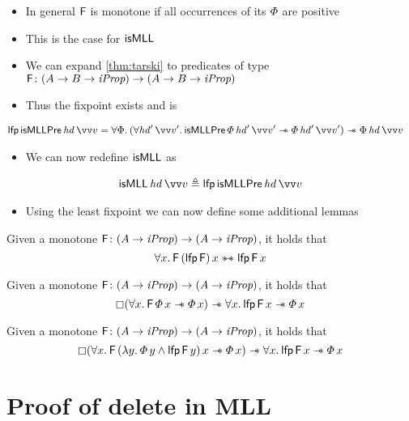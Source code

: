 \documentclass[thesis.tex]{subfiles}
\begin{document}
\begin{itemize}
  \item In general $\textsf{\upshape F}$ is monotone if all occurrences of its $\varPhi$ are positive
  \item This is the case for $\textsf{\upshape isMLL}$
  \item We can expand \cref*{thm:tarski} to predicates of type $\textsf{\upshape F}\colon (A \to B \to \textit{iProp}) \to (A \to B \to \textit{iProp})$
  \item Thus the fixpoint exists and is
\end{itemize}
\begin{align*}
  \lfp\, \textlog{isMLLPre}\, \langv{hd}\, \vect{v} & = \All \Phi. (\All \langv{hd}'\, \vect{v}'. \textlog{isMLLPre}\, \pred\, \langv{hd}'\, \vect{v}' \wand \pred\, \langv{hd}'\, \vect{v}') \wand \Phi \, \langv{hd}\, \vect{v}
\end{align*}
\begin{itemize}
  \item We can now redefine $\textsf{\upshape isMLL}$ as
\end{itemize}
\begin{align*}
  \textlog{isMLL}\, \langv{hd}\, \vect{v} \eqdef \lfp\, \textlog{isMLLPre}\, \langv{hd}\, \vect{v}
\end{align*}
\begin{itemize}
  \item Using the least fixpoint we can now define some additional lemmas
\end{itemize}
\begin{lemma}
  Given a monotone $\textsf{\upshape F}\colon (A \to \textit{iProp}) \to (A \to \textit{iProp})$, it holds that
  \[\All\var.\hopred\,(\lfp\,\hopred)\,\var \wandIff \lfp\,\hopred\,\var\]
\end{lemma}
\begin{lemma}
  Given a monotone $\textsf{\upshape F}\colon (A \to \textit{iProp}) \to (A \to \textit{iProp})$, it holds that
  \[\always(\All\var.\hopred\,\pred\,\var \wand \pred\,\var) \wand \All\var. \lfp\,\hopred\,\var \wand \pred\,\var\]
\end{lemma}
\begin{lemma}
  Given a monotone $\textsf{\upshape F}\colon (A \to \textit{iProp}) \to (A \to \textit{iProp})$, it holds that
  \[\always(\All\var.\hopred\,(\Lam\varB. \pred\,\varB \land \lfp\,\hopred\,\varB)\,\var \wand \pred\,\var) \wand \All\var. \lfp\,\hopred\,\var \wand \pred\,\var\]
\end{lemma}


\section{Proof of delete in MLL}
\label{sec:proofmll}
\end{document}
